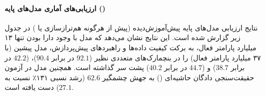 \paragraph*{ارزیابی‌های آماری مدل‌های پایه ()}
نتایج ارزیابی مدل‌های پایه پیش‌آموزش‌دیده (پیش از هرگونه هم‌ترازسازی یا ) در جدول زیر گزارش شده است. این نتایج نشان می‌دهد که مدل  با وجود دارا بودن تنها ۱۳ میلیارد پارامتر فعال، به برکت کیفیت داده‌ها و راهبردهای پیش‌پردازش، مدل پیشین  (با ۳۷ میلیارد پارامتر فعال) را در بنچمارک‌های متعددی نظیر  ($92.1$ در برابر $90.4$)،  ($42.2$ در برابر $38.7$) و  ($44.7$ در برابر $40.2$) پشت سر گذاشته است. همچنین مدل  در آزمون حقیقت‌سنجی دادگان حاشیه‌ای () به جهش چشمگیر $62.6$ (رشد نسبی ۱۳۱٪ نسبت به $27.1$) دست یافته است.

